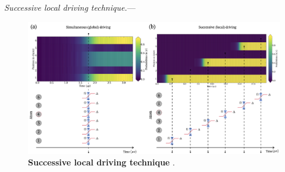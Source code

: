 \documentclass[%
 reprint,
nofootinbib,
 amsmath,amssymb,
 aps,
pra,
floatfix,
]{revtex4-2}
\begin{document}
\emph{Successive local driving technique.}--- 
\begin{figure}[ht!]
    \centering
    \includegraphics[width=12cm]{picture/successive_driving.png}
    \caption{\textbf{Successive local driving technique} . }
    \label{fig:successinve_driving}
\end{figure}
\end{document}
